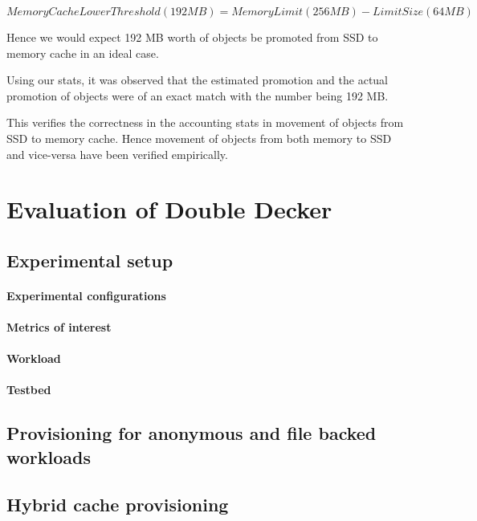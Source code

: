 	    \begin{equation}
	      MemoryCacheLowerThreshold (192 MB) = MemoryLimit (256 MB) - LimitSize (64 MB)
	    \end{equation}
	    
	    Hence we would expect 192 MB worth of objects be promoted from SSD to memory cache in an ideal case.
	    
	    
	    Using our stats, it was observed that the estimated promotion and the actual promotion of objects were of an exact match with 
	    the number being 192 MB.
	    
	    This verifies the correctness in the accounting stats in movement of objects from SSD to memory cache. Hence movement 
	    of objects from both memory to SSD and vice-versa have been verified empirically.
  
  
  
  \section{Evaluation of Double Decker}
  
    \subsection{Experimental setup}
	
	\paragraph{Experimental configurations}
	
	\paragraph{Metrics of interest}
	
	\paragraph{Workload}
	
	\paragraph{Testbed}
  
    \subsection{Provisioning for anonymous and file backed workloads}
    
    \subsection{Hybrid cache provisioning}
    